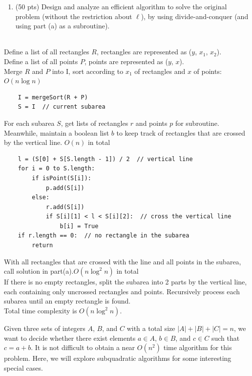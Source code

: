 \documentclass[11pt]{article}
\begin{document}
\begin{description}
\bigskip
\begin{enumerate}
\item[(b)] (50 pts)
Design and analyze an efficient algorithm to solve the original problem (without the restriction about $\ell$), by using divide-and-conquer (and using part (a) as a subroutine).
\end{enumerate}

\medskip
{}\\
Define a list of all rectangles $R$, rectangles are represented as ($y$, $x_1$, $x_2$).\\
Define a list of all points $P$, points are represented as ($y$, $x$).\\
Merge $R$ and $P$ into I, sort according to $x_1$ of rectangles and $x$ of points:
\hfill $O(n \log n)$
\begin{verbatim}
    I = mergeSort(R + P)
    S = I  // current subarea
\end{verbatim}
For each subarea $S$, get lists of rectangles $r$ and points $p$ for subroutine.\\
Meanwhile, maintain a boolean list $b$ to keep track of rectangles that are crossed by the vertical line. \hfill $O(n)$ in total
\begin{verbatim}
    l = (S[0] + S[S.length - 1]) / 2  // vertical line
    for i = 0 to S.length:
        if isPoint(S[i]):
            p.add(S[i])
        else:
            r.add(S[i])
            if S[i][1] < l < S[i][2]:  // cross the vertical line
                b[i] = True
    if r.length == 0:  // no rectangle in the subarea
        return
\end{verbatim}
With all rectangles that are crossed with the line and all points in the subarea, call solution in part(a).\hfill $O(n \log^2 n)$ in total\\
If there is no empty rectangles, split the subarea into 2 parts by the vertical line, each containing only uncrossed rectangles and points.
Recursively process each subarea until an empty rectangle is found.\\
Total time complexity is $O(n \log^2 n)$.


\newpage
\item[Problem 1.2:]
Given three sets of integers $A$, $B$, and $C$ with a total size $|A|+|B|+|C|=n$, we want to decide whether there exist elements $a\in A$, $b\in B$, and $c\in C$ such that
$c=a+b$. It is not difficult to obtain a near $O(n^2)$ time algorithm
for this problem.  Here, we will explore subquadratic algorithms
for some interesting special cases.


\end{description}
\end{document}
